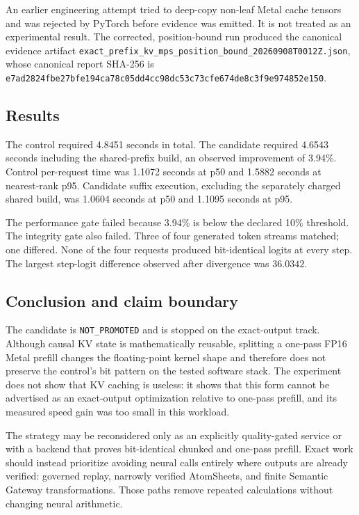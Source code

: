 An earlier engineering attempt tried to deep-copy non-leaf Metal cache tensors
and was rejected by PyTorch before evidence was emitted. It is not treated as
an experimental result. The corrected, position-bound run produced the
canonical evidence artifact
\texttt{exact\_prefix\_kv\_mps\_position\_bound\_20260908T0012Z.json}, whose
canonical report SHA-256 is
\texttt{e7ad2824fbe27bfe194ca78c05dd4cc98dc53c73cfe674de8c3f9e974852e150}.

\subsection{Results}

The control required 4.8451 seconds in total. The candidate required 4.6543
seconds including the shared-prefix build, an observed improvement of 3.94\%.
Control per-request time was 1.1072 seconds at p50 and 1.5882 seconds at
nearest-rank p95. Candidate suffix execution, excluding the separately charged
shared build, was 1.0604 seconds at p50 and 1.1095 seconds at p95.

The performance gate failed because 3.94\% is below the declared 10\% threshold.
The integrity gate also failed. Three of four generated token streams matched;
one differed. None of the four requests produced bit-identical logits at every
step. The largest step-logit difference observed after divergence was
$36.0342$.

\subsection{Conclusion and claim boundary}

The candidate is \texttt{NOT\_PROMOTED} and is stopped on the exact-output
track. Although causal KV state is mathematically reusable, splitting a
one-pass FP16 Metal prefill changes the floating-point kernel shape and therefore
does not preserve the control's bit pattern on the tested software stack. The
experiment does not show that KV caching is useless: it shows that this form
cannot be advertised as an exact-output optimization relative to one-pass
prefill, and its measured speed gain was too small in this workload.

The strategy may be reconsidered only as an explicitly quality-gated service or
with a backend that proves bit-identical chunked and one-pass prefill. Exact
work should instead prioritize avoiding neural calls entirely where outputs are
already verified: governed replay, narrowly verified AtomSheets, and finite
Semantic Gateway transformations. Those paths remove repeated calculations
without changing neural arithmetic.

